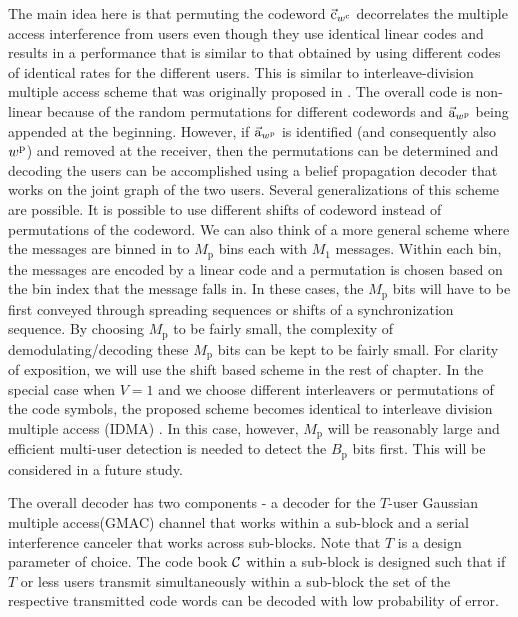 The main idea here is that permuting the codeword $\vec{\mathrm{c}}_{w^\mathrm{c}}$ decorrelates the multiple access interference from users even though they use identical linear codes and results in a performance that is similar to that obtained by using different codes of identical rates for the different users. This is similar to interleave-division multiple access scheme that was originally proposed in \cite{ping2006interleave}. The overall code is non-linear because of the random permutations for different codewords and $\vec{\mathrm{a}}_{w^\mathrm{p}}$ being appended at the beginning. However, if $\vec{\mathrm{a}}_{w^\mathrm{p}}$ is identified (and consequently also $w^\mathrm{p}$) and removed at the receiver, then the permutations can be determined and decoding the users  can be accomplished using a belief propagation decoder that works on the joint graph of the two users.
\iflonger
Several generalizations of this scheme are possible. It is possible to use different shifts of codeword instead of permutations of the codeword. We can also think of a more general scheme where the messages are binned in to $M_\mathrm{p}$ bins each with $M_1$ messages. Within each bin, the messages are encoded by a linear code and a permutation is chosen based on the bin index that the message falls in. In these cases, the $M_\mathrm{p}$ bits will have to be first conveyed through spreading sequences or shifts of a synchronization sequence. By choosing $M_\mathrm{p}$ to be fairly small, the complexity of demodulating/decoding these $M_\mathrm{p}$ bits can be kept to be fairly small. For clarity of exposition, we will use the shift based scheme in the rest of chapter. In the special case when $V=1$ and we choose different interleavers or permutations of the code symbols, the proposed scheme becomes identical to interleave division multiple access (IDMA) \cite{ping2006interleave}. In this case, however, $M_\mathrm{p}$ will be reasonably large and efficient multi-user detection is needed to detect the $B_\mathrm{p}$ bits first. This will be considered in a future study.
\fi

The overall decoder has two components - a decoder for the $T$-user Gaussian multiple access(GMAC) channel that works within a sub-block and a serial interference canceler that works across sub-blocks. Note that $T$ is a design parameter of choice. The code book $\mathcal{C}$ within a sub-block is designed such that if $T$ or less users transmit simultaneously within a sub-block the set of the respective transmitted code words can be decoded with low probability of error. 

